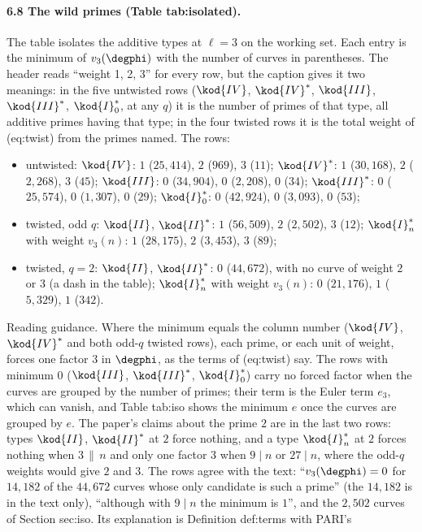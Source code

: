 \begin{sloppypar}
\paragraph{6.8 The wild primes (Table tab:isolated).} The table isolates the additive types at $\ell=3$ on the working set. Each entry is the minimum of $v_3(\degphi)$ with the
number of curves in parentheses. The header reads ``weight 1, 2, 3'' for every row, but the caption gives it two meanings: in the five untwisted rows ($\kod{IV}$, $\kod{IV}^*$,
$\kod{III}$, $\kod{III}^*$, $\kod{I}_0^*$, at any $q$) it is the number of primes of that type, all additive primes having that type; in the four twisted rows it is the total weight of
(eq:twist) from the primes named. The rows:
\begin{itemize}
\item untwisted: $\kod{IV}$: $1$ ($25{,}414$), $2$ ($969$), $3$ ($11$); $\kod{IV}^*$: $1$ ($30{,}168$), $2$ ($2{,}268$), $3$ ($45$); $\kod{III}$: $0$ ($34{,}904$), $0$ ($2{,}208$), $0$ ($34$); $\kod{III}^*$: $0$ ($25{,}574$),
$0$ ($1{,}307$), $0$ ($29$); $\kod{I}_0^*$: $0$ ($42{,}924$), $0$ ($3{,}093$), $0$ ($53$);
\item twisted, odd $q$: $\kod{II}$, $\kod{II}^*$: $1$ ($56{,}509$), $2$ ($2{,}502$), $3$ ($12$); $\kod{I}_n^*$ with weight $v_3(n)$: $1$ ($28{,}175$), $2$ ($3{,}453$), $3$ ($89$);
\item twisted, $q=2$: $\kod{II}$, $\kod{II}^*$: $0$ ($44{,}672$), with no curve of weight $2$ or $3$ (a dash in the table); $\kod{I}_n^*$ with weight $v_3(n)$: $0$ ($21{,}176$), $1$ ($5{,}329$), $1$ ($342$).
\end{itemize}
Reading guidance. Where the minimum equals the column number ($\kod{IV}$, $\kod{IV}^*$ and both odd-$q$ twisted rows), each prime, or each unit of weight, forces one factor $3$ in
$\degphi$, as the terms of (eq:twist) say. The rows with minimum $0$ ($\kod{III}$, $\kod{III}^*$, $\kod{I}_0^*$) carry no forced factor when the curves are grouped by the number of
primes; their term is the Euler term $e_3$, which can vanish, and Table tab:iso shows the minimum $e$ once the curves are grouped by $e$. The paper's claims about the
prime $2$ are in the last two rows: types $\kod{II}$, $\kod{II}^*$ at $2$ force nothing, and a type $\kod{I}_n^*$ at $2$ forces nothing when $3\,\|\,n$ and only one factor $3$ when $9\mid n$
or $27\mid n$, where the odd-$q$ weights would give $2$ and $3$. The rows agree with the text: ``$v_3(\degphi)=0$ for $14{,}182$ of the $44{,}672$ curves whose only candidate is
such a prime'' (the $14{,}182$ is in the text only), ``although with $9\mid n$ the minimum is $1$'', and the $2{,}502$ curves of Section sec:iso. Its explanation is Definition def:terms with PARI's

\end{sloppypar}
